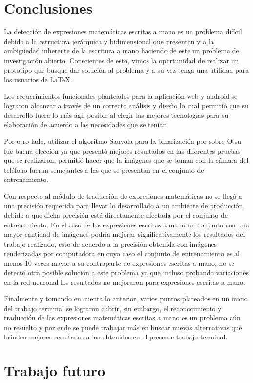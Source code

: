 \chapter{Conclusiones}
La detección de expresiones matemáticas escritas a mano es un problema difícil debido a la estructura jerárquica y bidimensional que presentan y a la ambigüedad inherente de la escritura a mano haciendo de este un problema de investigación abierto. Conscientes de esto, vimos la oportunidad de realizar un prototipo que busque dar solución al problema y a su vez tenga una utilidad para los usuarios de \LaTeX.

Los requerimientos funcionales planteados para la aplicación web y android se lograron alcanzar a través de un correcto análisis y diseño lo cual permitió que su desarrollo fuera lo más ágil posible al elegir las mejores tecnologías para su elaboración de acuerdo a las necesidades que se tenían.

Por otro lado, utilizar el algoritmo Sauvola para la binarización por sobre Otsu fue buena elección ya que presentó mejores resultados en las diferentes pruebas que se realizaron, permitió hacer que la imágenes que se toman con la cámara del teléfono fueran semejantes a las que se presentan en el conjunto de entrenamiento.

Con respecto al módulo de traducción de expresiones matemáticas no se llegó a una precisión requerida para llevar lo desarrollado a un ambiente de producción, debido a que dicha precisión está directamente afectada por el conjunto de entrenamiento. En el caso de las expresiones escritas a mano un conjunto con una mayor cantidad de imágenes podría mejorar significativamente los resultados del trabajo realizado, esto de acuerdo a la precisión obtenida con imágenes renderizadas por computadora en cuyo caso el conjunto de entrenamiento es al menos 10 veces mayor a su contraparte de expresiones escritas a mano, no se detectó otra posible solución a este problema ya que incluso probando variaciones en la red neuronal los resultados no mejoraron para expresiones escritas a mano.

Finalmente y tomando en cuenta lo anterior, varios puntos plateados en un inicio del trabajo terminal se lograron cubrir, sin embargo, el reconocimiento y traducción de las expresiones matemáticas escritas a mano es un problema aún no resuelto y por ende se puede trabajar más en buscar nuevas alternativas que brinden mejores resultados a los obtenidos en el presente trabajo terminal.

\chapter{Trabajo futuro}

